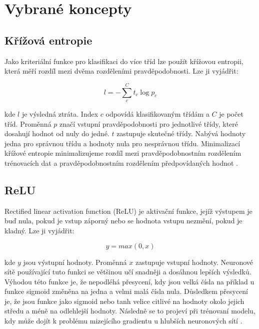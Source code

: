 \documentclass[FM,BP]{tulthesis}
\begin{document}
\section{Vybrané koncepty}

\subsection{Křížová entropie} %
Jako kriteriální funkce pro klasifikaci do více tříd lze použít křížovou entropii, která měří rozdíl mezi dvěma rozděleními pravděpodobnosti. Lze ji vyjádřit:

\begin{equation}
\label{eqn:cross_entropy}
l = -{\sum_{c}^{C}t_{c}\log p_{c}}
\end{equation}

kde $ l $ je výsledná ztráta. Index $ c $ odpovídá klasifikovaným třídám a $ C $ je počet tříd. Proměnná $ p $ značí vstupní pravděpodobnosti pro jednotlivé třídy, které dosahují hodnot od nuly do jedné. $ t $ zastupuje skutečné třídy. Nabývá hodnoty jedna pro správnou třídu a hodnoty nula pro nesprávnou třídu. Minimalizací křížové entropie minimalizujeme rozdíl mezi pravděpodobnostním rozdělením trénovacích dat a pravděpodobnostním rozdělením předpovídaných hodnot \cite{brownlee_2020}.

\subsection{ReLU} %
Rectified linear activation function (ReLU) je aktivační funkce, jejíž výstupem je buď nula, pokud je vstup záporný nebo se hodnota vstupu nezmění, pokud je kladný. Lze ji vyjádřit:

\begin{equation}
\label{eqn:relu}
y = max(0, x)
\end{equation}

kde $ y $ jsou výstupní hodnoty. Proměnná $ x $ zastupuje vstupní hodnoty. Neuronové sítě používající tuto funkci se většinou učí snadněji a dosáhnou lepších výsledků. Výhodou této funkce je, že nepodléhá přesycení, kdy jsou velká čísla na příklad u funkce sigmoid změněna na jedna a velmi malá čísla nula. Důsledkem přesycení je, že jsou funkce jako sigmoid nebo tanh velice citlivé na hodnoty okolo jejich středu a méně na odlehlejší hodnoty. Následně se to projeví při trénovaní modelu, kdy může dojít k problému mizejícího gradientu u hlubších neuronových sítí \cite{brownlee_2020_ReLU}.
\end{document}
